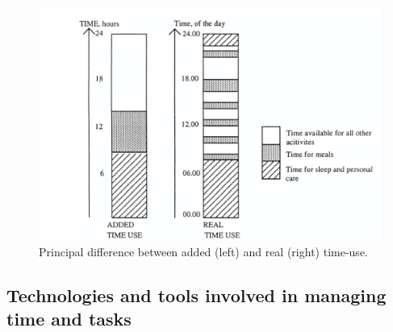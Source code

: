 \documentclass{chart}
\begin{document}
\begin{figure}
	\centering
	\includegraphics[width=0.45\linewidth]{fig2}
	\caption{Principal difference between added (left) and real (right) time-use.} 
	\label{fig:task management}
\end{figure}
\subsection{Technologies and tools involved in managing time and tasks}
\end{document}
